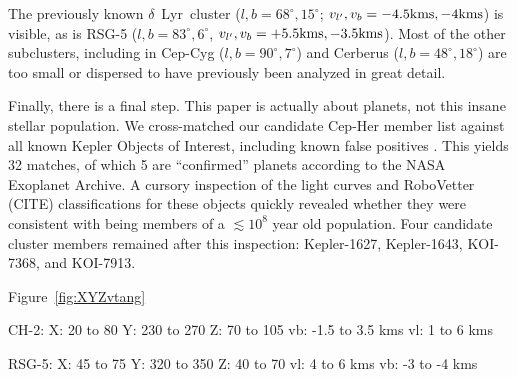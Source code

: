 \documentclass[12pt,twocolumn,linenumbers]{aastex63}
\begin{document}
The previously known $\delta$~Lyr\ cluster ($l,b=68^\circ,15^\circ$;
$v_{l'}, v_b=-4.5{\rm kms},-4{\rm kms}$) is visible, as is RSG-5
($l,b=83^\circ,6^\circ$, $v_{l'}, v_b=+5.5{\rm kms},-3.5{\rm kms}$).
Most of the other subclusters, including in Cep-Cyg
($l,b=90^\circ,7^\circ$) and Cerberus ($l,b=48^\circ,18^\circ$) are
too small or dispersed to have previously been analyzed in great
detail.

Finally, there is a final step.
This paper is actually about planets, not this insane stellar
population.
We cross-matched
our candidate Cep-Her member list against 
all known Kepler Objects of Interest, including known false positives
\citep{thompson_planetary_2018}.
This yields 32 matches, of which 5 are ``confirmed''
planets according to the NASA Exoplanet Archive.
A cursory inspection of the light curves and RoboVetter (CITE)
classifications for these objects quickly revealed whether they were
consistent with being members of a $\lesssim 10^8$ year old
population.
Four candidate cluster members remained after this inspection:
Kepler-1627, Kepler-1643, KOI-7368, and KOI-7913.

Figure~\ref{fig:XYZvtang}


CH-2:
X: 20 to 80
Y: 230 to 270
Z: 70 to 105
vb: -1.5 to 3.5 kms
vl: 1 to 6 kms

RSG-5:
X: 45 to 75
Y: 320 to 350
Z: 40 to 70
vl: 4 to 6 kms
vb: -3 to -4 kms



%
%
\end{document}
